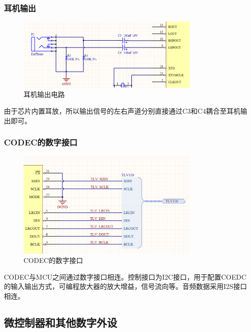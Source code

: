 \documentclass[16pt,a4paper]{article}
\begin{document}
\subsubsection{耳机输出}
\begin{figure}[H]
\centering
\includegraphics[width=0.8\textwidth]{EarPhone.png}
\caption{耳机输出电路} 
\end{figure}
由于芯片内置耳放，所以输出信号的左右声道分别直接通过C3和C4耦合至耳机输出即可。

\subsubsection{CODEC的数字接口}
\begin{figure}[H]
\centering
\includegraphics[width=0.8\textwidth]{DI.png}
\caption{CODEC的数字接口} 
\end{figure}
CODEC与MCU之间通过数字接口相连。控制接口为I2C接口，用于配置COEDC的输入输出方式，可编程放大器的放大增益，信号流向等。音频数据采用I2S接口相连。

\subsection{微控制器和其他数字外设}
\end{document}
